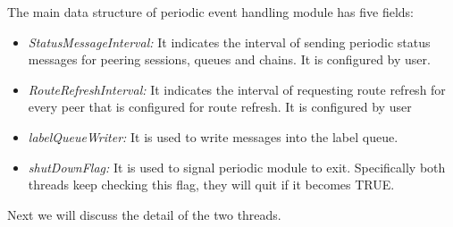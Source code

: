 The main data structure of periodic event handling module has five fields:
\begin{itemize}
\item{\emph{StatusMessageInterval:} It indicates the interval of sending periodic status messages for peering sessions, queues and chains. It is configured by user. }
\item{\emph{RouteRefreshInterval:} It indicates the interval of requesting route refresh for every peer that is configured for route refresh. It is configured by user }

\item{\emph{labelQueueWriter:} It is used to write messages into the label queue.}
\item{\emph{shutDownFlag:} It is used to signal periodic module to exit. Specifically both threads keep checking this flag, they will quit if it becomes TRUE.}
\end{itemize}
Next we will discuss the detail of the two threads.

